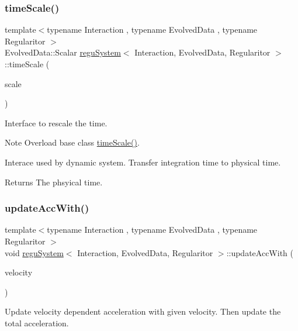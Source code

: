 \subsubsection{\texorpdfstring{time\+Scale()}{timeScale()}}
{\footnotesize\ttfamily template$<$typename Interaction , typename Evolved\+Data , typename Regularitor $>$ \\
Evolved\+Data\+::\+Scalar \mbox{\hyperlink{classregu_system}{regu\+System}}$<$ Interaction, Evolved\+Data, Regularitor $>$\+::time\+Scale (\begin{DoxyParamCaption}\item[{\mbox{\hyperlink{classregu_system_aca8ee2c387943164ee3ea68370fc3ac0}{Scalar}}}]{scale }\end{DoxyParamCaption})}



Interface to rescale the time. 

\begin{DoxyNote}{Note}
Overload base class \mbox{\hyperlink{classregu_system_ad9aa4594055c550b56cda4242d498d45}{time\+Scale()}}.
\end{DoxyNote}
Interace used by dynamic system. Transfer integration time to physical time. \begin{DoxyReturn}{Returns}
The phsyical time. 
\end{DoxyReturn}
\mbox{\label{classregu_system_a5928c1085fa45b17bfd0da8661819852}} 
\subsubsection{\texorpdfstring{update\+Acc\+With()}{updateAccWith()}}
{\footnotesize\ttfamily template$<$typename Interaction , typename Evolved\+Data , typename Regularitor $>$ \\
void \mbox{\hyperlink{classregu_system}{regu\+System}}$<$ Interaction, Evolved\+Data, Regularitor $>$\+::update\+Acc\+With (\begin{DoxyParamCaption}\item[{\mbox{\hyperlink{classregu_system_aa4ecefb5c437230b994171e231450be8}{Vector\+Array}} \&}]{velocity }\end{DoxyParamCaption})\hspace{0.3cm}{\ttfamily [private]}}



Update velocity dependent acceleration with given velocity. Then update the total acceleration. 

